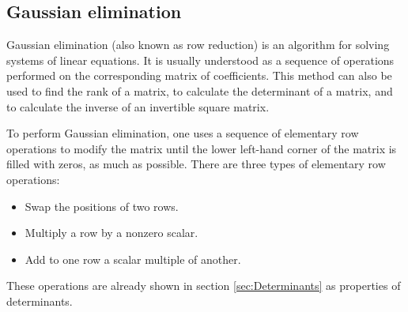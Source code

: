 \subsection{Gaussian elimination}
Gaussian elimination (also known as row reduction) is an algorithm for solving systems of linear equations. It is usually understood as a sequence of operations performed on the corresponding matrix of coefficients. This method can also be used to find the rank of a matrix, to calculate the determinant of a matrix, and to calculate the inverse of an invertible square matrix.\par
To perform Gaussian elimination, one uses a sequence of elementary row operations to modify the matrix until the lower left-hand corner of the matrix is filled with zeros, as much as possible. There are three types of elementary row operations:
\begin{itemize}
\item Swap the positions of two rows.
\item Multiply a row by a nonzero scalar.
\item Add to one row a scalar multiple of another.
\end{itemize}
These operations are already shown in section \ref{sec:Determinants} as properties of determinants.\par 
